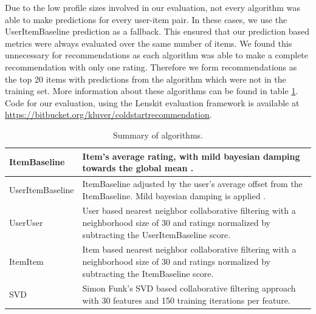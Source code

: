 \documentclass[letterpaper]{sig-alternate}
\begin{document}
  Due to the low profile sizes involved in our evaluation, not every algorithm was able to make predictions for every user-item pair.
  In these cases, we use the UserItemBaseline prediction as a fallback.
  This ensured that our prediction based metrics were always evaluated over the same number of items.
  We found this unnecessary for recommendations as each algorithm was able to make a complete recommendation with only one rating.
  Therefore we form recommendations as the top 20 items with predictions from the algorithm which were not in the training set. 
  More information about these algorithms can be found in table \ref{tbl:algo}.
  Code for our evaluation, using the Lenskit evaluation framework \cite{lenskit} is available at \url{https://bitbucket.org/kluver/coldstartrecommendation}.

  \begin{table}[ht!]
    \centering
    \begin{tabular}{|p{6em}|p{18em}|}
      \hline
      ItemBaseline       & Item's average rating, with mild bayesian damping towards the global mean \cite{funk_netflix_2006}. \\\hline
      UserItem\-Baseline & ItemBaseline adjusted by the user's average offset from the ItemBaseline. Mild bayesian damping is applied \cite{funk_netflix_2006}. \\\hline
      UserUser           & User based nearest neighbor collaborative filtering \cite{resnick1994grouplens} with a neighborhood size of 30 and ratings normalized by subtracting the UserItemBaseline score. \\\hline
      ItemItem           & Item based nearest neighbor collaborative filtering \cite{sarwar2001item} with a neighborhood size of 30 and ratings normalized by subtracting the ItemBaseline score.   \\\hline
      SVD                & Simon Funk's SVD based collaborative filtering approach \cite{funk_netflix_2006} with 30 features and 150 training iterations per feature. \\\hline
    \end{tabular}
    \caption{Summary of algorithms.}
    \label{tbl:algo}
  \end{table}
\end{document}
